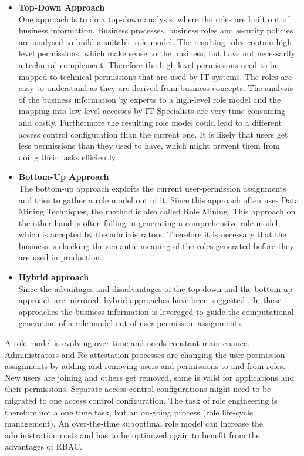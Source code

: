     \begin{itemize}
        \item \textbf{Top-Down Approach}\\
        One approach is to do a top-down analysis, where the roles are built out of business information. Business processes, business roles and security policies are analysed to build a suitable role model. The resulting roles contain high-level permissions, which make sense to the business, but have not necessarily a technical complement. Therefore the high-level permissions need to be mapped to technical permissions that are used by IT systems. The roles are easy to understand as they are derived from business concepts. The analysis of the business information by experts to a high-level role model and the mapping into low-level accesses by IT Specialists are very time-consuming and costly. Furthermore the resulting role model could lead to a different access control configuration than the current one. It is likely that users get less permissions than they used to have, which might prevent them from doing their tasks efficiently.
        
        \item \textbf{Bottom-Up Approach}\\        
        The bottom-up approach exploits the current user-permission assignments and tries to gather a role model out of it. Since this approach often uses Data Mining Techniques, the method is also called Role Mining\cite{Kuhlmann}. This approach on the other hand is often failing in generating a comprehensive role model, which is accepted by the administrators\cite{Frank:2013}. Therefore it is necessary that the business is checking the semantic meaning of the roles generated before they are used in production.
        
        \item \textbf{Hybrid approach}\\        
        Since the advantages and disadvantages of the top-down and the bottom-up approach are mirrored, hybrid approaches have been suggested \cite{Frank}\cite{6274146}. In these approaches the business information is leveraged to guide the computational generation of a role model out of user-permission assignments.
    \end{itemize}
    
    A role model is evolving over time and needs constant maintenance\cite{Montrieux:2011}. Administrators and Re-attestation processes are changing the user-permission assignments by adding and removing users and permissions to and from roles. New users are joining and others get removed, same is valid for applications and their permissions. Separate access control configurations might need to be migrated to one access control configuration. The task of role engineering is therefore not a one time task, but an on-going process (role life-cycle management\cite{kern2002observations}). An over-the-time suboptimal role model can increase the administration costs and has to be optimized again to benefit from the advantages of RBAC.
    
